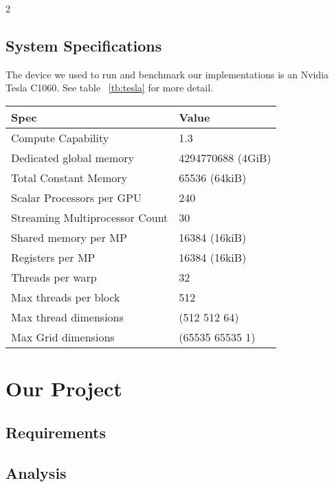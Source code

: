 \documentclass[10pt]{article}
\begin{document}
\begin{multicols}{2}
    \subsection{System Specifications}
    The device we used to run and benchmark our implementations is an Nvidia Tesla C1060.
    See table ~\ref{tb:tesla} for more detail.

    \begin{table*}[!hb]\centering
        \begin{tabular}{@{}l l@{}}\toprule
        \bf{Spec}                       &   \bf{Value}          \\
        \hline
        Compute Capability              &   1.3                 \\
        Dedicated global memory         &   4294770688 (4GiB)   \\
        Total Constant Memory           &   65536 (64kiB)       \\
        Scalar Processors per GPU       &   240                 \\
        Streaming Multiprocessor Count  &   30                  \\
        Shared memory per MP            &   16384 (16kiB)       \\
        Registers per MP                &   16384 (16kiB)       \\
        Threads per warp                &   32                  \\
        Max threads per block           &   512                 \\
        Max thread dimensions           &   (512 512 64)        \\
        Max Grid dimensions             &   (65535 65535 1)     \\
        \hline
        \end{tabular}
    \caption{Nvidia Tesla C1060 Specifications}
    \label{tb:tesla}
    \end{table*}

\section{Our Project}
    \subsection{Requirements} %
    \subsection{Analysis} %

\end{multicols}
\end{document}
